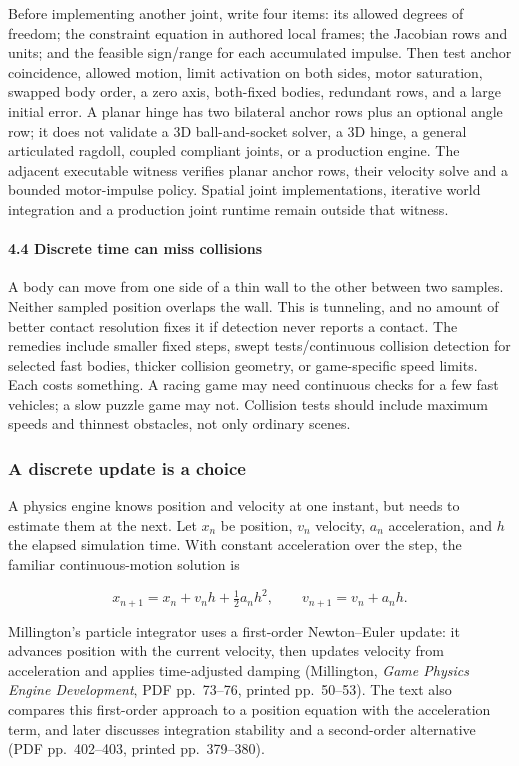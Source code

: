 Before implementing another joint, write four items: its allowed degrees of freedom; the constraint equation in authored local frames; the Jacobian rows and units; and the feasible sign/range for each accumulated impulse. Then test anchor coincidence, allowed motion, limit activation on both sides, motor saturation, swapped body order, a zero axis, both-fixed bodies, redundant rows, and a large initial error. A planar hinge has two bilateral anchor rows plus an optional angle row; it does not validate a 3D ball-and-socket solver, a 3D hinge, a general articulated ragdoll, coupled compliant joints, or a production engine. The adjacent executable witness verifies planar anchor rows, their velocity solve and a bounded motor-impulse policy. Spatial joint implementations, iterative world integration and a production joint runtime remain outside that witness.

\paragraph{4.4 Discrete time can miss collisions}\label{discrete-time-can-miss-collisions}

A body can move from one side of a thin wall to the other between two samples. Neither sampled position overlaps the wall. This is tunneling, and no amount of better contact resolution fixes it if detection never reports a contact. The remedies include smaller fixed steps, swept tests/continuous collision detection for selected fast bodies, thicker collision geometry, or game-specific speed limits. Each costs something. A racing game may need continuous checks for a few fast vehicles; a slow puzzle game may not. Collision tests should include maximum speeds and thinnest obstacles, not only ordinary scenes.

\subsubsection{A discrete update is a choice}\label{a-discrete-update-is-a-choice}

A physics engine knows position and velocity at one instant, but needs to estimate them at the next. Let \(x_n\) be position, \(v_n\) velocity, \(a_n\) acceleration, and \(h\) the elapsed simulation time. With constant acceleration over the step, the familiar continuous-motion solution is

\[
x_{n+1}=x_n+v_n h+\tfrac12 a_n h^2, \qquad v_{n+1}=v_n+a_n h.
\]

Millington's particle integrator uses a first-order Newton--Euler update: it advances position with the current velocity, then updates velocity from acceleration and applies time-adjusted damping (Millington, \emph{Game Physics Engine Development}, PDF pp.~73--76, printed pp.~50--53). The text also compares this first-order approach to a position equation with the acceleration term, and later discusses integration stability and a second-order alternative (PDF pp.~402--403, printed pp.~379--380).

